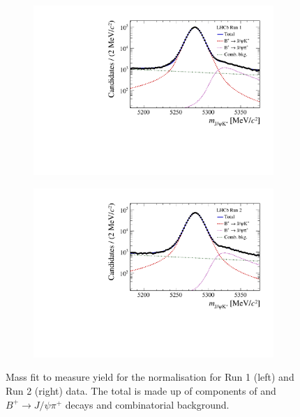 {{\begin{figure}[htbp]
    \centering
   \begin{subfigure}[b]{0.48\textwidth}
        \includegraphics[width=  \textwidth]{./Figs/BFAnalysis/BuJpsiK_Run1.pdf}
    \end{subfigure}
    \begin{subfigure}[b]{0.48\textwidth}
       \includegraphics[width=\textwidth]{./Figs/BFAnalysis/BuJpsiK_Run2.pdf}
   \end{subfigure}
    \caption{ Mass fit to measure \bujpsik yield for the normalisation for Run 1 (left) and Run 2 (right) data. The total \pdf is made up of components of \bujpsik and $B^{+} \to J/\psi \pi^{+}$ decays and combinatorial background.}

\end{figure}}}
